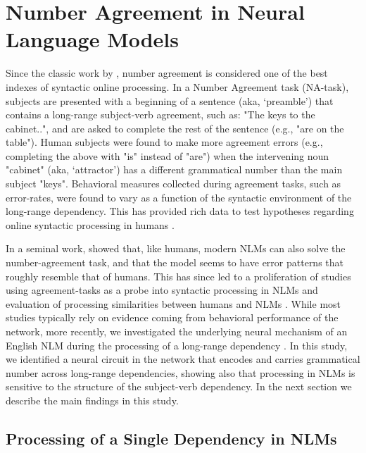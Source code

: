 \section{Number Agreement in Neural Language Models}
Since the classic work by \citet{Bock:Miller:1991}, number agreement is considered one of the best indexes of syntactic online processing. In a Number Agreement task (NA-task), subjects are presented with a beginning of a sentence (aka, `preamble') that contains a long-range subject-verb agreement, such as: "The keys to the cabinet..", and are asked to complete the rest of the sentence (e.g., "are on the table"). Human subjects were found to make more agreement errors (e.g., completing the above with "is" instead of "are") when the intervening noun "cabinet" (aka, `attractor') has a different grammatical number than the main subject "keys". Behavioral measures collected during agreement tasks, such as error-rates, were found to vary as a function of the syntactic environment of the long-range dependency. This has provided rich data to test hypotheses regarding online syntactic processing in humans \citep[e.g., ][]{franck2002subject, franck2006agreement, franck2007syntactic}.

In a seminal work, \citet{Linzen:etal:2016} showed that, like humans, modern NLMs can also solve the number-agreement task, and that the model seems to have error patterns that roughly resemble that of humans. This has since led to a proliferation of studies using agreement-tasks as a probe into syntactic processing in NLMs \citep[e.g.,][]{Gulordava:etal:2018, Kuncoro:etal:2018a} and evaluation of processing similarities between humans and NLMs \citep[e.g.,][]{Linzen:Leonard:2018}. While most studies typically rely on evidence coming from behavioral performance of the network, more recently, we investigated the underlying neural mechanism of an English NLM during the processing of a long-range dependency \citep{lakretz2019emergence}. In this study, we identified a neural circuit in the network that encodes and carries grammatical number across long-range dependencies, showing also that processing in NLMs is sensitive to the structure of the subject-verb dependency. In the next section we describe the main findings in this study.

\subsection{Processing of a Single Dependency in NLMs}
